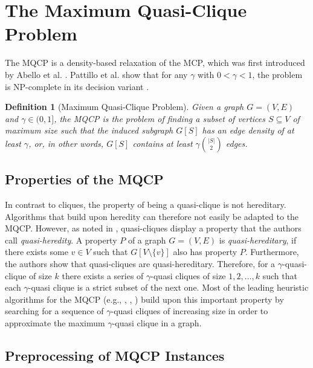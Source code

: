 \documentclass[draft,final]{vutinfth} %
\newtheorem{definition}{Definition}[section]
\begin{document}
\section{The Maximum Quasi-Clique Problem}\label{sec:mqcp}

The MQCP is a density-based relaxation of the MCP, which was first introduced by Abello et al. \cite{Abello2002}. Pattillo et al. show that for any $\gamma$ with $0 < \gamma < 1$, the problem is NP-complete in its decision variant \cite{pattillo_maximum_2013}. 

\begin{definition}[Maximum Quasi-Clique Problem]
	\label{def:mqcp}
	Given a graph $G = (V,E)$ and $\gamma \in (0,1]$, the MQCP is the problem of finding a subset of vertices $S \subseteq V$ of maximum size 
	such that the induced subgraph $G[S]$ has an edge density of at least $\gamma$, or, in other words, $G[S]$ contains at least $\gamma \binom{|S|}{2}$ edges. 
\end{definition}

\subsection{Properties of the MQCP}
In contrast to cliques, the property of being a quasi-clique is not hereditary. Algorithms that build upon heredity can therefore not easily be adapted to the MQCP. However, as noted in \cite{pattillo_maximum_2013}, quasi-cliques display a property that the authors call \textit{quasi-heredity}. A property $P$ of a graph $G = (V, E)$ is \textit{quasi-hereditary}, if there exists some $v \in V$ such that $G[V \setminus \{v\}]$ also has property $P$. Furthermore, the authors show that quasi-cliques are quasi-hereditary. Therefore, for a $\gamma$-quasi-clique of size $k$ there exists a series of $\gamma$-quasi cliques of size $1,2, \dots, k$ such that each $\gamma$-quasi clique is a strict subset of the next one. Most of the leading heuristic algorithms for the MQCP (e.g., \cite{djeddi_extension_2019}, \cite{zhou_opposition-based_2020}, \cite{chen_nuqclq_2021}) build upon this important property by searching for a sequence of $\gamma$-quasi cliques of increasing size in order to approximate the maximum $\gamma$-quasi clique in a graph. 

\subsection{Preprocessing of MQCP Instances}
\end{document}

